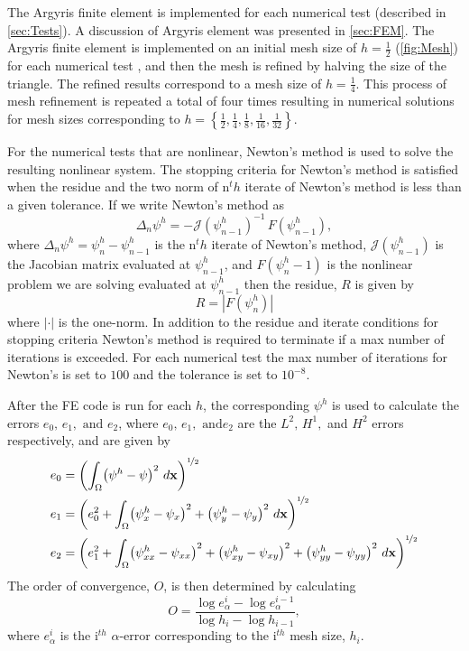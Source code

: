 The Argyris finite element is implemented for each numerical test (described in
\autoref{sec:Tests}). A discussion of Argyris element was presented in
\autoref{sec:FEM}. The Argyris finite element is implemented on an initial mesh
size of $h=\frac{1}{2}$ (\autoref{fig:Mesh}) for each numerical test , and then
the mesh is refined by halving the size of the triangle. The refined results
correspond to a mesh size of $h=\frac{1}{4}$.  This process of mesh refinement
is repeated a total of four times resulting in numerical solutions for mesh
sizes corresponding to
$h=\left\{\frac{1}{2},\frac{1}{4},\frac{1}{8},\frac{1}{16},\frac{1}{32}\right\}$.


For the numerical tests that are nonlinear, Newton's method is used to solve the
resulting nonlinear system. The stopping criteria for Newton's method is
satisfied when the residue and the two norm of n$^th$ iterate of Newton's method
is less than a given tolerance. If we write Newton's method as
\begin{equation*}
  \Delta_n \psi^h = -\mathcal{J}(\psi^h_{n-1})^{-1}\, F(\psi^h_{n-1}),
\end{equation*}
where $\Delta_n \psi^h = \psi^h_n - \psi^h_{n-1}$ is the n$^th$ iterate of
Newton's method, $\mathcal{J}(\psi^h_{n-1})$ is the Jacobian matrix evaluated at
$\psi^h_{n-1}$, and $F(\psi^h_n-1)$ is the nonlinear problem we are solving
evaluated at $\psi^h_{n-1}$ then the residue, $R$ is given by
\begin{equation*}
  R = \left|F(\psi^h_n)\right|
\end{equation*}
where $|\cdot|$ is the one-norm. In addition to the residue and iterate
conditions for stopping criteria Newton's method is required to terminate if a
max number of iterations is exceeded. For each numerical test the max number of
iterations for Newton's is set to $100$ and the tolerance is set to $10^{-8}$.

After the FE code is run for each $h$, the corresponding $\psi^h$ is used to
calculate the errors $e_0,\, e_1,\text{ and } e_2$, where $e_0,\, e_1,\text{ and
} e_2$ are the $L^2,\, H^1,$ and $H^2$ errors respectively, and are given by
\begin{align*}
  e_0 &= \left(\int_{\Omega}\!\left( \psi^h - \psi \right)^2 \,d\mathbf{x}\right)^{\nicefrac{1}{2}}\\
  e_1 &= \left(e_0^2 + \int_{\Omega}\!  \left( \psi^h_x - \psi_x \right)^2 + \left( \psi^h_y - \psi_y \right)^2
    \,d\mathbf{x}\right)^{\nicefrac{1}{2}}\\
  e_2 &= \left(e_1^2 + \int_{\Omega}\!  \left( \psi^h_{xx} - \psi_{xx} \right)^2 + \left( \psi^h_{xy} - \psi_{xy}
    \right)^2 + \left( \psi^h_{yy} - \psi_{yy} \right)^2 \,d\mathbf{x}\right)^{\nicefrac{1}{2}}\\
\end{align*}
The order of convergence, $O$, is then determined by calculating
\begin{equation*}
  O = \dfrac{\log e_{\alpha}^i - \log e_{\alpha}^{i-1}}{\log h_i - \log h_{i-1}},
\end{equation*}
where $e_{\alpha}^i$ is the i$^{th}$ $\alpha$-error corresponding to the
i$^{th}$ mesh size, $h_i$.

